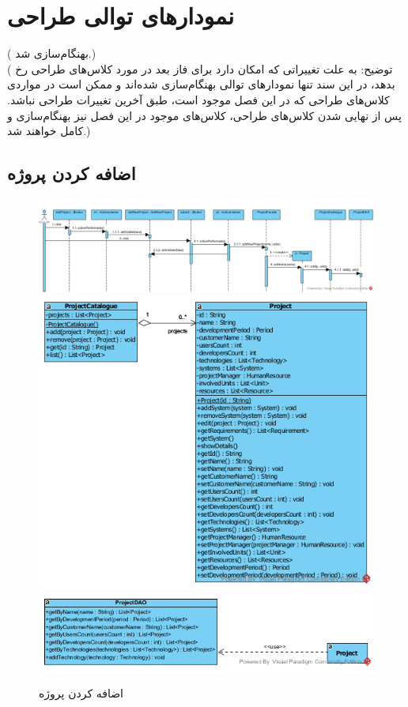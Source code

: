 \chapter{نمودارهای توالی طراحی}
({\color{red}  بهنگام‌سازی شد.})\\
({\color{red}  ‌توضیح: به علت تغییراتی که امکان دارد برای فاز بعد در مورد کلاس‌های طراحی رخ بدهد، در این سند تنها نمودارهای توالی بهنگام‌سازی شده‌اند و ممکن است در مواردی کلاس‌های طراحی که در این فصل موجود است، طبق آخرین تغییرات طراحی نباشد. پس از نهایی شدن کلاس‌های طراحی، کلاس‌های موجود در این فصل نیز بهنگام‌سازی و کامل خواهند شد.})

\newpage
\begin{landscape}
\section{اضافه کردن پروژه}
\begin{figure}[H]
	\centering
	\includegraphics[scale=0.6]{img/sequence-design/AddProjectToOrganization}	
	\includegraphics[scale=0.6]{img/sequence-design/AddProjectToOrganizationC}
	\includegraphics[scale=0.6]{img/sequence-design/AddProjectToOrganizationD}
	\caption{اضافه کردن پروژه}
\end{figure}
\end{landscape}

